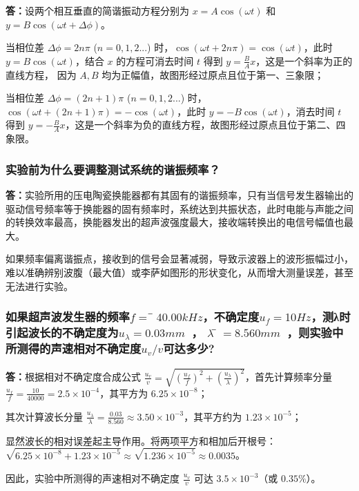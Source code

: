 \documentclass[10pt,a4paper]{ctexart}
\begin{document}
    \textbf{答：}设两个相互垂直的简谐振动方程分别为 $x = A \cos(\omega t)$ 和 $y = B \cos(\omega t + \Delta \phi)$。
    
    当相位差 $\Delta \phi = 2n\pi$ ($n=0,1,2...$) 时，$\cos(\omega t + 2n\pi) = \cos(\omega t)$，此时 $y = B \cos(\omega t)$，结合 $x$ 的方程可消去时间 $t$ 得到 $y = \frac{B}{A}x$，这是一个斜率为正的直线方程，
    因为 $A,B$ 均为正幅值，故图形经过原点且位于第一、三象限；
    
    当相位差 $\Delta \phi = (2n+1)\pi$ ($n=0,1,2...$) 时，$\cos(\omega t + (2n+1)\pi) = -\cos(\omega t)$，此时 $y = -B \cos(\omega t)$，消去时间 $t$ 得到 $y = -\frac{B}{A}x$，这是一个斜率为负的直线方程，故图形经过原点且位于第二、四象限。   
    
    \subsubsection*{实验前为什么要调整测试系统的谐振频率？}

    \textbf{答：}实验所用的压电陶瓷换能器都有其固有的谐振频率，只有当信号发生器输出的驱动信号频率等于换能器的固有频率时，系统达到共振状态，此时电能与声能之间的转换效率最高，换能器发出的超声波强度最大，接收端转换出的电信号幅值也最大。
    
    如果频率偏离谐振点，接收到的信号会显著减弱，导致示波器上的波形振幅过小，难以准确辨别波腹（最大值）或李萨如图形的形状变化，从而增大测量误差，甚至无法进行实验。
    \subsubsection*{如果超声波发生器的频率$f =̅40.00kHz$，不确定度$u_f=10Hz$，测λ时引起波长的不确定度为$u_λ=0.03mm$ ， $λ ̅=8.560mm$ ，则实验中所测得的声速相对不确定度$u_v/v$可达多少?}

    \textbf{答：}根据相对不确定度合成公式 $\frac{u_v}{v} = \sqrt{(\frac{u_f}{f})^2 + (\frac{u_\lambda}{\lambda})^2}$，首先计算频率分量 $\frac{u_f}{f} = \frac{10}{40000} = 2.5 \times 10^{-4}$，其平方为 $6.25 \times 10^{-8}$；
    
    其次计算波长分量 $\frac{u_\lambda}{\lambda} = \frac{0.03}{8.560} \approx 3.50 \times 10^{-3}$，其平方约为 $1.23 \times 10^{-5}$；
    
    显然波长的相对误差起主导作用。将两项平方和相加后开根号：$\sqrt{6.25 \times 10^{-8} + 1.23 \times 10^{-5}} \approx \sqrt{1.236 \times 10^{-5}} \approx 0.0035$。
    
    因此，实验中所测得的声速相对不确定度 $\frac{u_v}{v}$ 可达 $3.5 \times 10^{-3}$（或 $0.35\%$）。
\newpage
\end{document}
